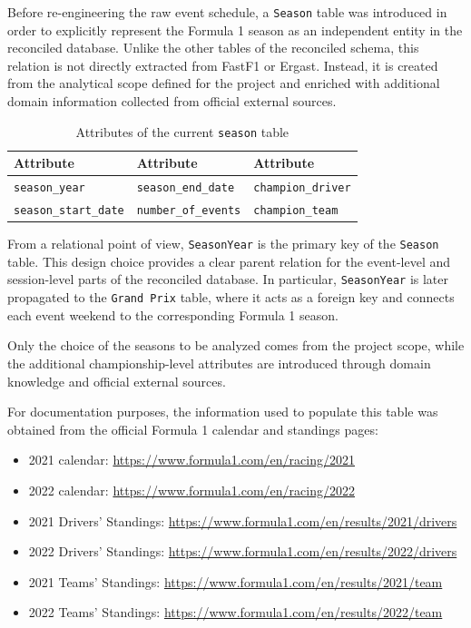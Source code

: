 \documentclass[12pt,a4paper]{article}
\begin{document}
	Before re-engineering the raw event schedule, a \texttt{Season} table was introduced in order to explicitly represent the Formula 1 season as an independent entity in the reconciled database.
	Unlike the other tables of the reconciled schema, this relation is not directly extracted from FastF1 or Ergast.
	Instead, it is created from the analytical scope defined for the project and enriched with additional domain information collected from official external sources.
	

	
	\begin{table}[H]
		\centering
		\caption{Attributes of the current \texttt{season} table}
		\renewcommand{\arraystretch}{1.15}
		\begin{tabularx}{0.9\textwidth}{>{\raggedright\arraybackslash}X >{\raggedright\arraybackslash}X >{\raggedright\arraybackslash}X}
			\toprule
			\textbf{Attribute} & \textbf{Attribute} & \textbf{Attribute} \\
			\midrule
			\texttt{season\_year} & \texttt{season\_end\_date} & \texttt{champion\_driver} \\
			\texttt{season\_start\_date} & \texttt{number\_of\_events} & \texttt{champion\_team} \\
			\bottomrule
		\end{tabularx}
	\end{table}
	
	From a relational point of view, \texttt{SeasonYear} is the primary key of the \texttt{Season} table.
	This design choice provides a clear parent relation for the event-level and session-level parts of the reconciled database.
	In particular, \texttt{SeasonYear} is later propagated to the \texttt{Grand Prix} table, where it acts as a foreign key and connects each event weekend to the corresponding Formula 1 season.
	

	Only the choice of the seasons to be analyzed comes from the project scope, while the additional championship-level attributes are introduced through domain knowledge and official external sources.
	
	For documentation purposes, the information used to populate this table was obtained from the official Formula 1 calendar and standings pages:
	\begin{itemize}
		\item 2021 calendar: \url{https://www.formula1.com/en/racing/2021}
		\item 2022 calendar: \url{https://www.formula1.com/en/racing/2022}
		\item 2021 Drivers' Standings: \url{https://www.formula1.com/en/results/2021/drivers}
		\item 2022 Drivers' Standings: \url{https://www.formula1.com/en/results/2022/drivers}
		\item 2021 Teams' Standings: \url{https://www.formula1.com/en/results/2021/team}
		\item 2022 Teams' Standings: \url{https://www.formula1.com/en/results/2022/team}
	\end{itemize}
	
\end{document}
